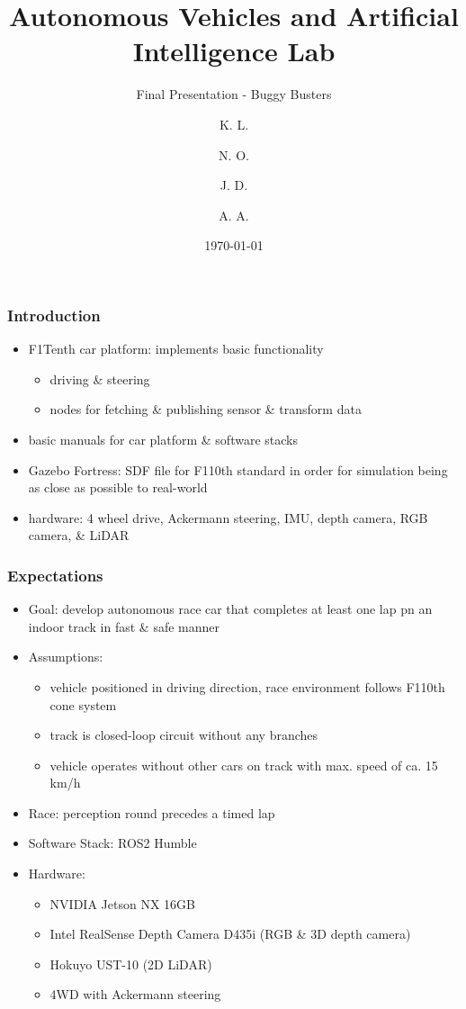 \documentclass{beamer}
\title{Autonomous Vehicles and Artificial Intelligence Lab}
\subtitle{Final Presentation - Buggy Busters}
\author{
	K. L.
	\and
	N. O.
	\and
	J. D.
	\and
	A. A.
}
\institute{Ruhr University Bochum}
\date{\today}
\begin{document}
\begin{frame}
	\titlepage
\end{frame}

\begin{frame}
	\frametitle{Introduction}
	\begin{itemize}
		\item F1Tenth car platform: implements basic functionality
		\begin{itemize}
			\item driving \& steering
			\item nodes for fetching \& publishing sensor \& transform data
		\end{itemize}
		\item basic manuals for car platform \& software stacks
		\item Gazebo Fortress: SDF file for F110th standard in order for simulation being as close as possible to real-world
		\item hardware: 4 wheel drive, Ackermann steering, IMU, depth camera, RGB camera, \& LiDAR
	\end{itemize}
\end{frame}

\begin{frame}
	\frametitle{Expectations}
	\begin{itemize}
		\item Goal: develop autonomous race car that completes at least one lap pn an indoor track in fast \& safe manner
		\item Assumptions:
		\begin{itemize}
			\item vehicle positioned in driving direction, race environment follows F110th cone system
			\item track is closed-loop circuit without any branches
			\item vehicle operates without other cars on track with max. speed of ca. 15 km/h
		\end{itemize} 
		\item Race: perception round precedes a timed lap
		\item Software Stack: ROS2 Humble
		\item Hardware:
		\begin{itemize}
			\item NVIDIA Jetson NX 16GB
			\item Intel RealSense Depth Camera D435i (RGB \& 3D depth camera)
			\item Hokuyo UST-10 (2D LiDAR)
			\item 4WD with Ackermann steering
		\end{itemize}
	\end{itemize}
\end{frame}
\end{document}
